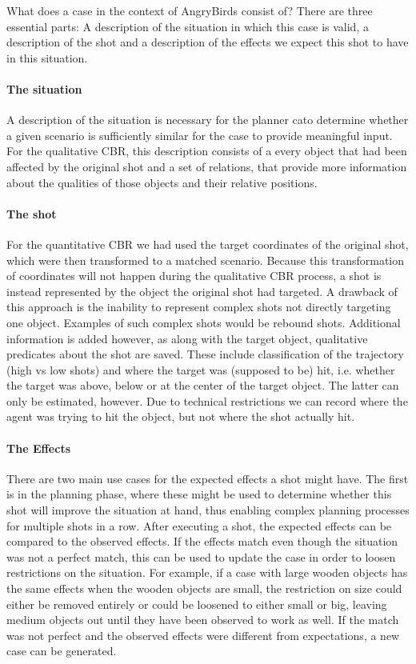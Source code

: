 What does a case in the context of AngryBirds consist of? There are three essential parts: A description of the situation in which this case is valid, a description of the shot and a description of the effects we expect this shot to have in this situation.

\paragraph{The situation}
A description of the situation is necessary for the planner cato determine whether a given scenario is sufficiently similar for the case to provide meaningful input.
For the qualitative CBR, this description consists of a every object that had been affected by the original shot and a set of relations, that provide more information about the qualities of those objects and their relative positions.


\paragraph{The shot}
For the quantitative CBR we had used the target coordinates of the original shot, which were then transformed to a matched scenario.
Because this transformation of coordinates will not happen during the qualitative CBR process, a shot is instead represented by the object the original shot had targeted.
A drawback of this approach is the inability to represent complex shots not directly targeting one object.
Examples of such complex shots would be rebound shots.
Additional information is added however, as along with the target object, qualitative predicates about the shot are saved. These include classification of the trajectory (high vs low shots) and where the target was (supposed to be) hit, i.e. whether the target was above, below or at the center of the target object.
The latter can only be estimated, however. Due to technical restrictions we can record where the agent was trying to hit the object, but not where the shot actually hit.


\paragraph{The Effects}
There are two main use cases for the expected effects a shot might have. The first is in the planning phase, where these might be used to determine whether this shot will improve the situation at hand, thus enabling complex planning processes for multiple shots in a row.
After executing a shot, the expected effects can be compared to the observed effects. If the effects match even though the situation was not a perfect match, this can be used to update the case in order to loosen restrictions on the situation.
For example, if a case with large wooden objects has the same effects when the wooden objects are small, the restriction on size could either be removed entirely or could be loosened to either small or big, leaving medium objects out until they have been observed to work as well.
If the match was not perfect and the observed effects were different from expectations, a new case can be generated.

